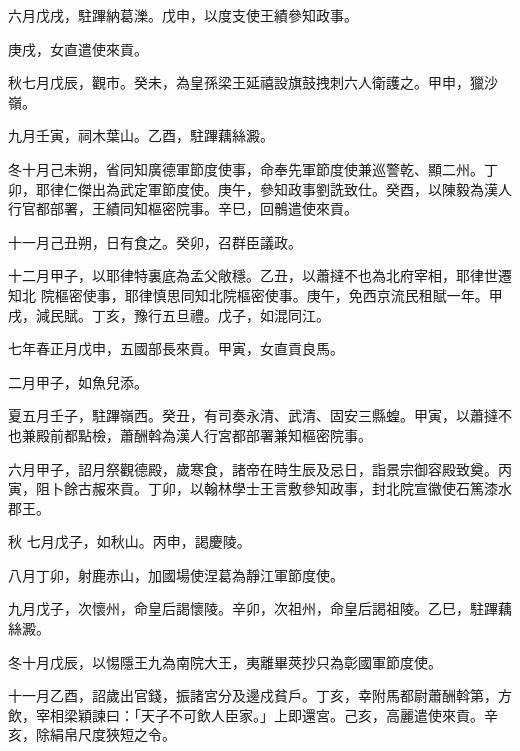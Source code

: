 \begin{pinyinscope}
 六月戊戌，駐蹕納葛濼。戊申，以度支使王績參知政事。



 庚戌，女直遣使來貢。



 秋七月戊辰，觀市。癸未，為皇孫梁王延禧設旗鼓拽刺六人衛護之。甲申，獵沙嶺。



 九月壬寅，祠木葉山。乙酉，駐蹕藕絲澱。



 冬十月己未朔，省同知廣德軍節度使事，命奉先軍節度使兼巡警乾、顯二州。丁卯，耶律仁傑出為武定軍節度使。庚午，參知政事劉詵致仕。癸酉，以陳毅為漢人行官都部署，王績同知樞密院事。辛巳，回鶻遣使來貢。



 十一月己丑朔，日有食之。癸卯，召群臣議政。



 十二月甲子，以耶律特裏底為孟父敞穩。乙丑，以蕭撻不也為北府宰相，耶律世遷知北
 院樞密使事，耶律慎思同知北院樞密使事。庚午，免西京流民租賦一年。甲戌，減民賦。丁亥，豫行五旦禮。戊子，如混同江。



 七年春正月戊申，五國部長來貢。甲寅，女直貢良馬。



 二月甲子，如魚兒添。



 夏五月壬子，駐蹕嶺西。癸丑，有司奏永清、武清、固安三縣蝗。甲寅，以蕭撻不也兼殿前都點檢，蕭酬斡為漢人行宮都部署兼知樞密院事。



 六月甲子，詔月祭觀德殿，歲寒食，諸帝在時生辰及忌日，詣景宗御容殿致奠。丙寅，阻卜餘古赧來貢。丁卯，以翰林學士王言敷參知政事，封北院宣徽使石篤漆水郡王。



 秋
 七月戊子，如秋山。丙申，謁慶陵。



 八月丁卯，射鹿赤山，加國場使涅葛為靜江軍節度使。



 九月戊子，次懷州，命皇后謁懷陵。辛卯，次祖州，命皇后謁祖陵。乙巳，駐蹕藕絲澱。



 冬十月戊辰，以惕隱王九為南院大王，夷離畢莢抄只為彰國軍節度使。



 十一月乙酉，詔歲出官錢，振諸宮分及邊戍貧戶。丁亥，幸附馬都尉蕭酬斡第，方飲，宰相梁穎諫曰：「天子不可飲人臣家。」上即還宮。己亥，高麗遣使來貢。辛亥，除絹帛尺度狹短之令。




\end{pinyinscope}
